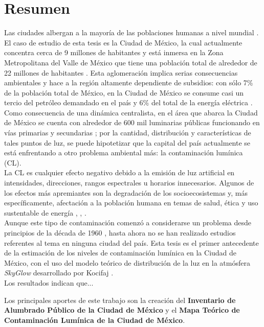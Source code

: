 \chapter{Resumen}

Las ciudades albergan a la mayoría de las poblaciones humanas a nivel mundial \citep{Zari2018}. El caso de estudio de esta tesis es la Ciudad de México, la cual actualmente concentra cerca de 9 millones de habitantes \citep{INEGI2015} y está inmersa en la Zona Metropolitana del Valle de México que tiene una población total de alrededor de 22 millones de habitantes \citep{OCDE2015}. Esta aglomeración implica serias consecuencias ambientales y hace a la región altamente dependiente de subsidios: con sólo 7\% de la población total de México, en la Ciudad de México se consume casi un tercio del petróleo demandado en el país y 6\% del total de la energía eléctrica \citep{SENER2013}.\\

Como consecuencia de una dinámica centralista, en el área que abarca la Ciudad de México se cuenta con alrededor de 600 mil luminarias públicas funcionando en vías primarias y secundarias \citep{INFO2019}; por la cantidad, distribución y características de tales puntos de luz, se puede hipotetizar que la capital del país actualmente se está enfrentando a otro problema ambiental más: la contaminación lumínica (CL).\\

La CL es cualquier efecto negativo debido a la emisión de luz artificial en intensidades, direcciones, rangos espectrales u horarios innecesarios. Algunos de los efectos más apremiantes son la degradación de los socioecosistemas y, más específicamente, afectación a la población humana en temas de salud, ética y uso sustentable de energía \citep{AtlasREPSA}, \citep{LibroCL}, \citep{Stone2017}.\\

Aunque este tipo de contaminación comenzó a considerarse un problema desde principios de la década de 1960 \citep{LibroCL}, hasta ahora no se han realizado estudios referentes al tema en ninguna ciudad del país. Esta tesis es el primer antecedente de la estimación de los niveles de contaminación lumínica en la Ciudad de México, con el uso del modelo teórico de distribución de la luz en la atmósfera \textit{SkyGlow} desarrollado por Kocifaj \citep{Kocifaj2007}.\\


Los resultados indican que...

Los principales aportes de este trabajo son la creación del \textbf{Inventario de Alumbrado Público de la Ciudad de México} y el \textbf{Mapa Teórico de Contaminación Lumínica de la Ciudad de México}.
